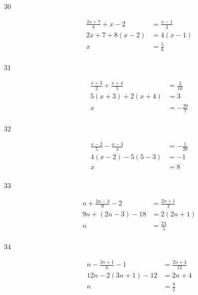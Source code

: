 \documentclass[letterpaper, landscape]{exam}
\begin{document}
\begin{description}
      \item[30]
        \begin{align*}
          \frac{2x + 7}{8} + x - 2 & = \frac{x-1}{2} \\
          2x + 7 + 8(x - 2)        & = 4(x - 1) \\
          x                        & = \boxed{ \frac{5}{6} } \\
        \end{align*}

      \item[31]
        \begin{align*}
          \frac{x + 3}{2} + \frac{x + 4}{5} & = \frac{3}{10} \\
          5(x + 3) + 2(x + 4)               & = 3 \\
          x                                 & = \boxed{ -\frac{20}{7} } \\
        \end{align*}


      \item[32]
        \begin{align*}
          \frac{x - 2}{5} - \frac{x - 3}{4} & = -\frac{1}{20} \\
          4(x - 2) - 5(5 - 3)               & = -1 \\
          x                                 & = \boxed{ 8 } \\
        \end{align*}

      \item[33]
        \begin{align*}
          n + \frac{2n - 3}{9} - 2 & = \frac{2n + 1}{3} \\
          9n + (2n - 3) - 18       & = 2 (2n + 1) \\
          n                        & = \boxed{ \frac{24}{5} } \\
        \end{align*}

      \item[34]
        \begin{align*}
          n - \frac{3n + 1}{6} - 1 & = \frac{2n + 4}{12} \\
          12n - 2(3n + 1) - 12     & = 2n + 4 \\
          n                        & = \boxed{ \frac{9}{2} } \\
        \end{align*}


\end{description}
\end{document}
